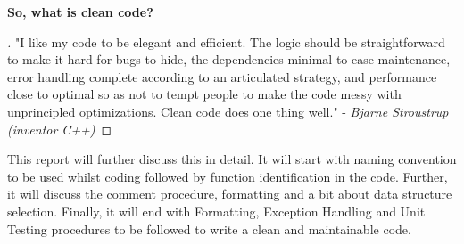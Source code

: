 \documentclass[12pt]{article}
\begin{document}

\noindent \textbf{So, what is clean code?}
\begin{proof}[]
"I like my code to be elegant and efficient. The logic should be straightforward to make it hard for bugs to hide, the dependencies minimal to ease maintenance, error handling complete according to an articulated strategy, and performance close to optimal so as not to tempt people to make the code messy with unprincipled optimizations. Clean code does one thing well." - \textit{Bjarne Stroustrup (inventor C++)}
\end{proof}

This report will further discuss this in detail. It will start with naming convention to be used whilst coding followed by function identification in the code. Further, it will discuss the comment procedure, formatting and a bit about data structure selection. Finally, it will end with Formatting, Exception Handling and Unit Testing procedures to be followed to write a clean and maintainable code.
\end{document}
